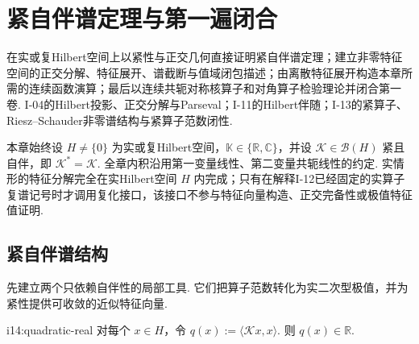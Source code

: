 \chapter{紧自伴谱定理与第一遍闭合}\label{chap:I-14}
\FAChapterOpening
{在实或复Hilbert空间上以紧性与正交几何直接证明紧自伴谱定理；建立非零特征空间的正交分解、特征展开、谱截断与值域闭包描述；由离散特征展开构造本章所需的连续函数演算；最后以连续共轭对称核算子和对角算子检验理论并闭合第一卷.}
{I-04的Hilbert投影、正交分解与Parseval；I-11的Hilbert伴随；I-13的紧算子、Riesz--Schauder非零谱结构与紧算子范数闭性.}
{\begin{center}
\end{center}}

本章始终设 \(\displaystyle H\neq\{0\}\) 为实或复Hilbert空间，\(\displaystyle \mathbb K\in\{\mathbb R,\mathbb C\}\)，并设 \(\displaystyle \mathcal K\in\mathcal B(H)\) 紧且自伴，即 \(\displaystyle \mathcal K^*=\mathcal K\). 全章内积沿用第一变量线性、第二变量共轭线性的约定. 实情形的特征分解完全在实Hilbert空间 \(\displaystyle H\) 内完成；只有在解释I-12已经固定的实算子复谱记号时才调用复化接口，该接口不参与特征向量构造、正交完备性或极值特征值证明.

\section{紧自伴谱结构}\label{sec:i14-compact-self-adjoint}

先建立两个只依赖自伴性的局部工具. 它们把算子范数转化为实二次型极值，并为紧性提供可收敛的近似特征向量.

\begin{FALemma}[C][自伴二次型取实值]{i14:quadratic-real}
对每个 \(\displaystyle x\in H\)，令 \(\displaystyle q(x):=\langle\mathcal Kx,x\rangle\).
则 \(\displaystyle q(x)\in\mathbb R\).
\end{FALemma}

